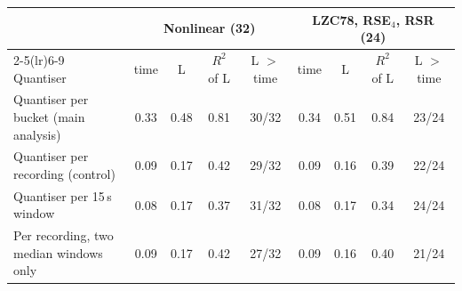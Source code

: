 \begin{tabular}{lcccccccc}
\toprule
 & \multicolumn{4}{c}{Nonlinear (32)} & \multicolumn{4}{c}{LZC78, RSE$_4$, RSR (24)}\\
\cmidrule(lr){2-5}\cmidrule(lr){6-9}
Quantiser & time & L & $R^2$ of L & L $>$ time & time & L & $R^2$ of L & L $>$ time\\
\midrule
Quantiser per bucket (main analysis) & 0.33 & 0.48 & 0.81 & 30/32 & 0.34 & 0.51 & 0.84 & 23/24\\
Quantiser per recording (control) & 0.09 & 0.17 & 0.42 & 29/32 & 0.09 & 0.16 & 0.39 & 22/24\\
Quantiser per 15\,s window & 0.08 & 0.17 & 0.37 & 31/32 & 0.08 & 0.17 & 0.34 & 24/24\\
Per recording, two median windows only & 0.09 & 0.17 & 0.42 & 27/32 & 0.09 & 0.16 & 0.40 & 21/24\\
\bottomrule
\end{tabular}
